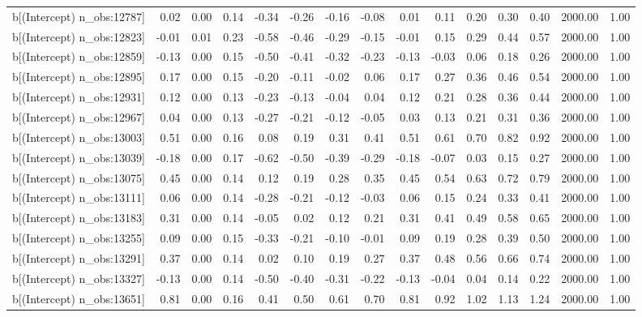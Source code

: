 \begin{table}[ht]
\begin{tabular}{rrrrrrrrrrrrrrr}
  b[(Intercept) n\_obs:12787] & 0.02 & 0.00 & 0.14 & -0.34 & -0.26 & -0.16 & -0.08 & 0.01 & 0.11 & 0.20 & 0.30 & 0.40 & 2000.00 & 1.00 \\ 
  b[(Intercept) n\_obs:12823] & -0.01 & 0.01 & 0.23 & -0.58 & -0.46 & -0.29 & -0.15 & -0.01 & 0.15 & 0.29 & 0.44 & 0.57 & 2000.00 & 1.00 \\ 
  b[(Intercept) n\_obs:12859] & -0.13 & 0.00 & 0.15 & -0.50 & -0.41 & -0.32 & -0.23 & -0.13 & -0.03 & 0.06 & 0.18 & 0.26 & 2000.00 & 1.00 \\ 
  b[(Intercept) n\_obs:12895] & 0.17 & 0.00 & 0.15 & -0.20 & -0.11 & -0.02 & 0.06 & 0.17 & 0.27 & 0.36 & 0.46 & 0.54 & 2000.00 & 1.00 \\ 
  b[(Intercept) n\_obs:12931] & 0.12 & 0.00 & 0.13 & -0.23 & -0.13 & -0.04 & 0.04 & 0.12 & 0.21 & 0.28 & 0.36 & 0.44 & 2000.00 & 1.00 \\ 
  b[(Intercept) n\_obs:12967] & 0.04 & 0.00 & 0.13 & -0.27 & -0.21 & -0.12 & -0.05 & 0.03 & 0.13 & 0.21 & 0.31 & 0.36 & 2000.00 & 1.00 \\ 
  b[(Intercept) n\_obs:13003] & 0.51 & 0.00 & 0.16 & 0.08 & 0.19 & 0.31 & 0.41 & 0.51 & 0.61 & 0.70 & 0.82 & 0.92 & 2000.00 & 1.00 \\ 
  b[(Intercept) n\_obs:13039] & -0.18 & 0.00 & 0.17 & -0.62 & -0.50 & -0.39 & -0.29 & -0.18 & -0.07 & 0.03 & 0.15 & 0.27 & 2000.00 & 1.00 \\ 
  b[(Intercept) n\_obs:13075] & 0.45 & 0.00 & 0.14 & 0.12 & 0.19 & 0.28 & 0.35 & 0.45 & 0.54 & 0.63 & 0.72 & 0.79 & 2000.00 & 1.00 \\ 
  b[(Intercept) n\_obs:13111] & 0.06 & 0.00 & 0.14 & -0.28 & -0.21 & -0.12 & -0.03 & 0.06 & 0.15 & 0.24 & 0.33 & 0.41 & 2000.00 & 1.00 \\ 
  b[(Intercept) n\_obs:13183] & 0.31 & 0.00 & 0.14 & -0.05 & 0.02 & 0.12 & 0.21 & 0.31 & 0.41 & 0.49 & 0.58 & 0.65 & 2000.00 & 1.00 \\ 
  b[(Intercept) n\_obs:13255] & 0.09 & 0.00 & 0.15 & -0.33 & -0.21 & -0.10 & -0.01 & 0.09 & 0.19 & 0.28 & 0.39 & 0.50 & 2000.00 & 1.00 \\ 
  b[(Intercept) n\_obs:13291] & 0.37 & 0.00 & 0.14 & 0.02 & 0.10 & 0.19 & 0.27 & 0.37 & 0.48 & 0.56 & 0.66 & 0.74 & 2000.00 & 1.00 \\ 
  b[(Intercept) n\_obs:13327] & -0.13 & 0.00 & 0.14 & -0.50 & -0.40 & -0.31 & -0.22 & -0.13 & -0.04 & 0.04 & 0.14 & 0.22 & 2000.00 & 1.00 \\ 
  b[(Intercept) n\_obs:13651] & 0.81 & 0.00 & 0.16 & 0.41 & 0.50 & 0.61 & 0.70 & 0.81 & 0.92 & 1.02 & 1.13 & 1.24 & 2000.00 & 1.00 \\ 

\end{tabular}
\end{table}
